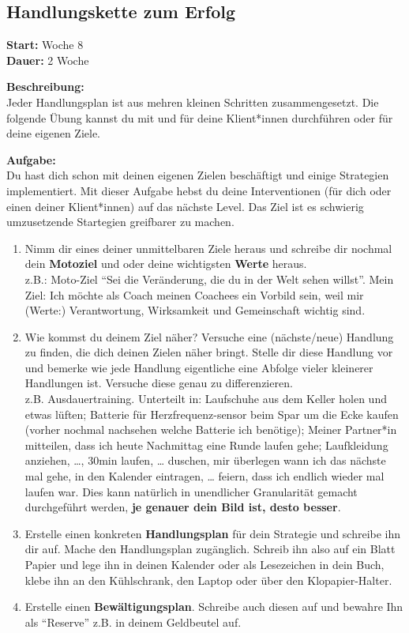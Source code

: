 \documentclass[
  letterpaper,
  DIV=11,
  numbers=noendperiod]{scrreprt}
\begin{document}
\subsection{Handlungskette zum Erfolg}\label{handlungskette-zum-erfolg}

\textbf{Start:} Woche 8\\
\textbf{Dauer:} 2 Woche

\textbf{Beschreibung:}\\
Jeder Handlungsplan ist aus mehren kleinen Schritten zusammengesetzt.
Die folgende Übung kannst du mit und für deine Klient*innen durchführen
oder für deine eigenen Ziele.

\textbf{Aufgabe:}\\
Du hast dich schon mit deinen eigenen Zielen beschäftigt und einige
Strategien implementiert. Mit dieser Aufgabe hebst du deine
Interventionen (für dich oder einen deiner Klient*innen) auf das nächste
Level. Das Ziel ist es schwierig umzusetzende Startegien greifbarer zu
machen.

\begin{enumerate}
\def\labelenumi{\arabic{enumi}.}
\item
  Nimm dir eines deiner unmittelbaren Ziele heraus und schreibe dir
  nochmal dein \textbf{Motoziel} und oder deine wichtigsten
  \textbf{Werte} heraus.\\
  z.B.: Moto-Ziel ``Sei die Veränderung, die du in der Welt sehen
  willst''. Mein Ziel: Ich möchte als Coach meinen Coachees ein Vorbild
  sein, weil mir (Werte:) Verantwortung, Wirksamkeit und Gemeinschaft
  wichtig sind.
\item
  Wie kommst du deinem Ziel näher? Versuche eine (nächste/neue) Handlung
  zu finden, die dich deinen Zielen näher bringt. Stelle dir diese
  Handlung vor und bemerke wie jede Handlung eigentliche eine Abfolge
  vieler kleinerer Handlungen ist. Versuche diese genau zu
  differenzieren.\\
  z.B. Ausdauertraining. Unterteilt in: Laufschuhe aus dem Keller holen
  und etwas lüften; Batterie für Herzfrequenz-sensor beim Spar um die
  Ecke kaufen (vorher nochmal nachsehen welche Batterie ich benötige);
  Meiner Partner*in mitteilen, dass ich heute Nachmittag eine Runde
  laufen gehe; Laufkleidung anziehen, \ldots, 30min laufen, \ldots{}
  duschen, mir überlegen wann ich das nächste mal gehe, in den Kalender
  eintragen, \ldots{} feiern, dass ich endlich wieder mal laufen war.
  Dies kann natürlich in unendlicher Granularität gemacht durchgeführt
  werden, \textbf{je genauer dein Bild ist, desto besser}.
\item
  Erstelle einen konkreten \textbf{Handlungsplan} für dein Strategie und
  schreibe ihn dir auf. Mache den Handlungsplan zugänglich. Schreib ihn
  also auf ein Blatt Papier und lege ihn in deinen Kalender oder als
  Lesezeichen in dein Buch, klebe ihn an den Kühlschrank, den Laptop
  oder über den Klopapier-Halter.
\item
  Erstelle einen \textbf{Bewältigungsplan}. Schreibe auch diesen auf und
  bewahre Ihn als ``Reserve'' z.B. in deinem Geldbeutel auf.
\end{enumerate}
\end{document}
